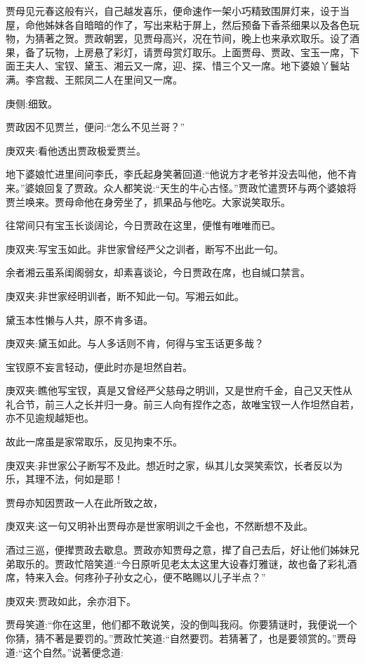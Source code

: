 \begin{parag}
    贾母见元春这般有兴，自己越发喜乐，便命速作一架小巧精致围屏灯来，设于当屋，命他姊妹各自暗暗的作了，写出来粘于屏上，然后预备下香茶细果以及各色玩物，为猜著之贺。贾政朝罢，见贾母高兴，况在节间，晚上也来承欢取乐。设了酒果，备了玩物，上房悬了彩灯，请贾母赏灯取乐。上面贾母、贾政、宝玉一席，下面王夫人、宝钗、黛玉、湘云又一席，迎、探、惜三个又一席。地下婆娘丫鬟站满。李宫裁、王熙凤二人在里间又一席。\begin{note}庚侧:细致。\end{note}贾政因不见贾兰，便问:“怎么不见兰哥？”\begin{note}庚双夹:看他透出贾政极爱贾兰。\end{note}地下婆娘忙进里间问李氏，李氏起身笑著回道:“他说方才老爷并没去叫他，他不肯来。”婆娘回复了贾政。众人都笑说:“天生的牛心古怪。”贾政忙遣贾环与两个婆娘将贾兰唤来。贾母命他在身旁坐了，抓果品与他吃。大家说笑取乐。
\end{parag}


\begin{parag}
    往常间只有宝玉长谈阔论，今日贾政在这里，便惟有唯唯而已。\begin{note}庚双夹:写宝玉如此。非世家曾经严父之训者，断写不出此一句。\end{note}余者湘云虽系闺阁弱女，却素喜谈论，今日贾政在席，也自缄口禁言。\begin{note}庚双夹:非世家经明训者，断不知此一句。写湘云如此。\end{note}黛玉本性懒与人共，原不肯多语。\begin{note}庚双夹:黛玉如此。与人多话则不肯，何得与宝玉话更多哉？\end{note}宝钗原不妄言轻动，便此时亦是坦然自若。\begin{note}庚双夹:瞧他写宝钗，真是又曾经严父慈母之明训，又是世府千金，自己又天性从礼合节，前三人之长并归一身。前三人向有捏作之态，故唯宝钗一人作坦然自若，亦不见逾规越矩也。\end{note}故此一席虽是家常取乐，反见拘束不乐。\begin{note}庚双夹:非世家公子断写不及此。想近时之家，纵其儿女哭笑索饮，长者反以为乐，其理不法，何如是耶！\end{note}贾母亦知因贾政一人在此所致之故，\begin{note}庚双夹:这一句又明补出贾母亦是世家明训之千金也，不然断想不及此。\end{note}酒过三巡，便撵贾政去歇息。贾政亦知贾母之意，撵了自己去后，好让他们姊妹兄弟取乐的。贾政忙陪笑道:“今日原听见老太太这里大设春灯雅谜，故也备了彩礼酒席，特来入会。何疼孙子孙女之心，便不略赐以儿子半点？”\begin{note}庚双夹:贾政如此，余亦泪下。\end{note}贾母笑道:“你在这里，他们都不敢说笑，没的倒叫我闷。你要猜谜时，我便说一个你猜，猜不著是要罚的。”贾政忙笑道:“自然要罚。若猜著了，也是要领赏的。”贾母道:“这个自然。”说著便念道:
\end{parag}


